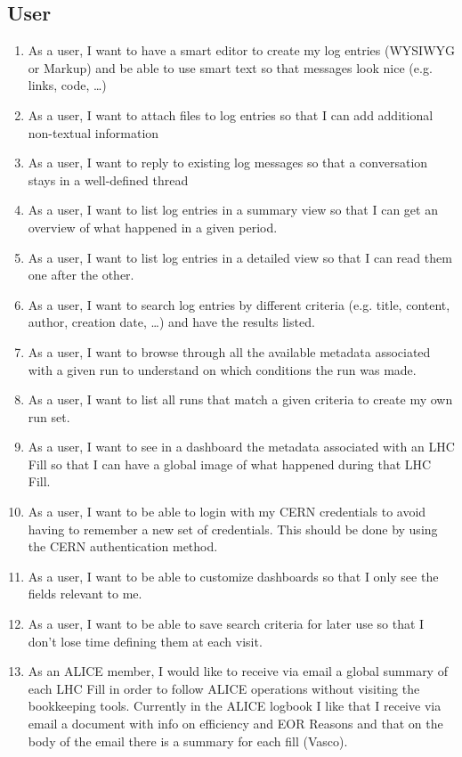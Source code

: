 \subsection{User}
\begin{enumerate}
  \item As a user, I want to have a smart editor to create my log entries (WYSIWYG or Markup) and be able to use smart text so that messages look nice (e.g. links, code, …) 
  \item As a user, I want to attach files to log entries so that I can add additional non-textual information
  \item As a user, I want to reply to existing log messages so that a conversation stays in a well-defined thread
  \item As a user, I want to list log entries in a summary view so that I can get an overview of what happened in a given period.
  \item As a user, I want to list log entries in a detailed view so that I can read them one after the other.
  \item As a user, I want to search log entries by different criteria (e.g. title, content, author, creation date, …) and have the results listed. 
  \item As a user, I want to browse through all the available metadata associated with a given run to understand on which conditions the run was made. 
  \item As a user, I want to list all runs that match a given criteria to create my own run set. 
  \item As a user, I want to see in a dashboard the metadata associated with an LHC Fill so that I can have a global image of what happened during that LHC Fill. 
  \item As a user, I want to be able to login with my CERN credentials to avoid having to remember a new set of credentials. This should be done by using the CERN authentication method.
  \item As a user, I want to be able to customize dashboards so that I only see the fields relevant to me. 
  \item As a user, I want to be able to save search criteria for later use so that I don’t lose time defining them at each visit. 
  \item As an ALICE member, I would like to receive via email a global summary of each LHC Fill in order to follow ALICE operations without visiting the bookkeeping tools. Currently in the ALICE logbook I like that I receive via email a document with info on efficiency and EOR Reasons and that on the body of the email there is a summary for each fill (Vasco).

\end{enumerate}

